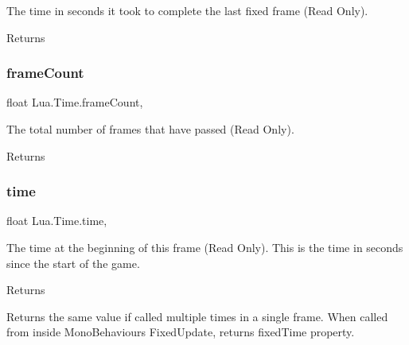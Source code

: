 The time in seconds it took to complete the last fixed frame (Read Only). 

\begin{DoxyReturn}{Returns}

\end{DoxyReturn}
\mbox{\label{class_lua_1_1_time_ae821e279218bd2e418f6bafc2e66cc4f}} 
\subsubsection{\texorpdfstring{frameCount}{frameCount}}
{\footnotesize\ttfamily float Lua.\+Time.\+frame\+Count\hspace{0.3cm}{\ttfamily [static]}, {\ttfamily [get]}}



The total number of frames that have passed (Read Only). 

\begin{DoxyReturn}{Returns}

\end{DoxyReturn}
\mbox{\label{class_lua_1_1_time_a6a7753473015073c35d5ae5bc4edfdf3}} 
\subsubsection{\texorpdfstring{time}{time}}
{\footnotesize\ttfamily float Lua.\+Time.\+time\hspace{0.3cm}{\ttfamily [static]}, {\ttfamily [get]}}



The time at the beginning of this frame (Read Only). This is the time in seconds since the start of the game. 

\begin{DoxyReturn}{Returns}

\end{DoxyReturn}
Returns the same value if called multiple times in a single frame. When called from inside Mono\+Behaviour\textquotesingle{}s Fixed\+Update, returns fixed\+Time property. \mbox{\label{class_lua_1_1_time_af1a087ea59af5ee339aa26ae49c13370}} 
